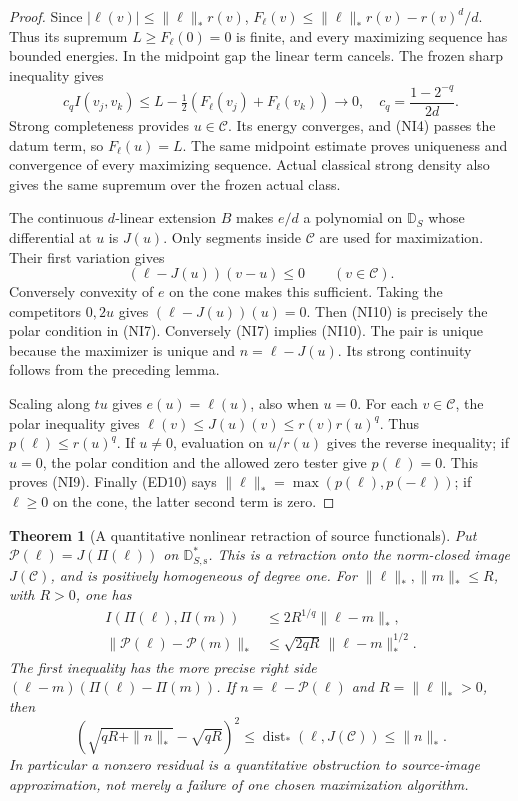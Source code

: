 \documentclass[11pt,a4paper]{article}
\numberwithin{equation}{section}
\newtheorem{theorem}{Theorem}[section]
\theoremstyle{definition}
\theoremstyle{remark}
\begin{document}
\begin{proof}
Since $|\ell(v)|\leq\|\ell\|_*r(v)$,
$F_\ell(v)\leq\|\ell\|_*r(v)-r(v)^d/d$. Thus its supremum
$L\geq F_\ell(0)=0$ is finite, and every maximizing sequence
has bounded energies. In the midpoint gap the linear term
cancels. The frozen sharp inequality gives
\[
 c_q I(v_j,v_k)
     \leq L-\tfrac12(F_\ell(v_j)+F_\ell(v_k))\longrightarrow0,
 \quad c_q=\frac{1-2^{-q}}{2d}.
\]
Strong completeness provides $u\in\mathscr C$. Its energy
converges, and (NI4) passes the datum term, so $F_\ell(u)=L$.
The same midpoint estimate proves uniqueness and convergence
of every maximizing sequence. Actual classical strong density
also gives the same supremum over the frozen actual class.

The continuous $d$-linear extension $B$ makes $e/d$ a polynomial
on $\mathbb D_S$ whose differential at $u$ is $J(u)$.
Only segments inside $\mathscr C$ are used for maximization.
Their first variation gives
\[
                   (\ell-J(u))(v-u)\leq0\qquad(v\in\mathscr C).
 \tag{NI10}
\]
Conversely convexity of $e$ on the cone makes this sufficient.
Taking the competitors $0,2u$ gives $(\ell-J(u))(u)=0$.
Then (NI10) is precisely the polar condition in (NI7).
Conversely (NI7) implies (NI10). The pair is unique because
the maximizer is unique and $n=\ell-J(u)$. Its strong continuity
follows from the preceding lemma.

Scaling along $tu$ gives $e(u)=\ell(u)$, also when $u=0$.
For each $v\in\mathscr C$, the polar inequality gives
$\ell(v)\leq J(u)(v)\leq r(v)r(u)^q$. Thus
$p(\ell)\leq r(u)^q$. If $u\ne0$, evaluation on $u/r(u)$
gives the reverse inequality; if $u=0$, the polar condition
and the allowed zero tester give $p(\ell)=0$. This proves
(NI9). Finally (ED10) says
$\|\ell\|_* =\max(p(\ell),p(-\ell))$; if $\ell\geq0$ on
the cone, the latter second term is zero.
\end{proof}

\begin{theorem}[A quantitative nonlinear retraction of source functionals]
\label{thm:r12-source-retraction}
Put $\mathcal P(\ell)=J(\Pi(\ell))$ on
$\mathbb D_{S,\mathrm{s}}^*$. This is a retraction onto the norm-closed
image $J(\mathscr C)$, and is positively homogeneous of degree one.
For $\|\ell\|_*,\|m\|_*\leq R$, with $R>0$, one has
\[
 \begin{split}
 I(\Pi(\ell),\Pi(m))&\leq2R^{1/q}\|\ell-m\|_*,\\
 \|\mathcal P(\ell)-\mathcal P(m)\|_*
                         &\leq\sqrt{2qR}\,\|\ell-m\|_*^{1/2}.
 \end{split}
 \tag{NI11}
\]
The first inequality has the more precise right side
$(\ell-m)(\Pi(\ell)-\Pi(m))$. If
$n=\ell-\mathcal P(\ell)$ and $R=\|\ell\|_*>0$, then
\[
 \left(\sqrt{qR+\|n\|_*}-\sqrt{qR}\right)^2
 \leq\operatorname{dist}_*(\ell,J(\mathscr C))\leq\|n\|_*.
 \tag{NI12}
\]
In particular a nonzero residual is a quantitative obstruction to
source-image approximation, not merely a failure of one chosen
maximization algorithm.
\end{theorem}
\end{document}
